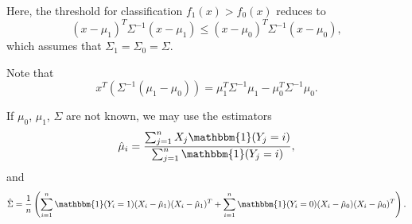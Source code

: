 Here, the threshold for classification $f_1(x)>f_0(x)$ reduces to 
\[(x-\mu_1)^T\Sigma^{-1}(x-\mu_1)\leq (x-\mu_0)^T\Sigma^{-1}(x-\mu_0),\]
which assumes that $\Sigma_1=\Sigma_0=\Sigma$.

Note  that
\[x^T(\Sigma^{-1}(\mu_1-\mu_0))=\mu_1^T\Sigma^{-1}\mu_1-\mu_0^T\Sigma^{-1}\mu_0.\]

If $\mu_0$, $\mu_1$, $\Sigma$ are not known, we may use the estimators 
\[\hat{\mu}_i = \frac{\sum_{j=1}^nX_j\mathbbm{1}(Y_j=i)}{\sum_{j=1}^n\mathbbm{1}(Y_j=i)},\]
and 
\[\hat{\Sigma} = \frac{1}{n}\left(\sum_{i=1}^n\mathbbm{1}(Y_i=1)(X_i-\hat{\mu}_1)(X_i-\hat{\mu}_1)^T + \sum_{i=1}^n\mathbbm{1}(Y_i=0)(X_i-\hat{\mu}_0)(X_i-\hat{\mu}_0)^T\right).\]